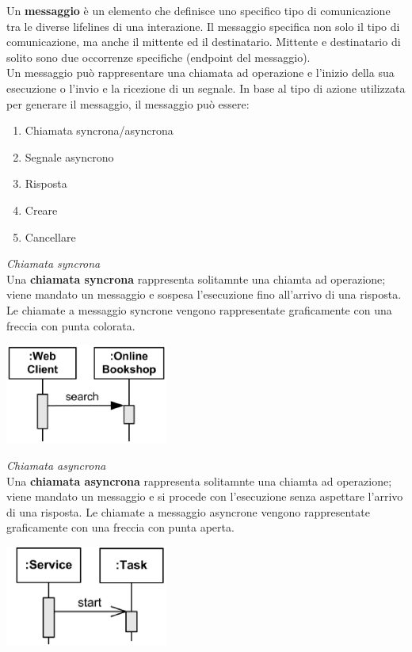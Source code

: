 \documentclass{article}
\begin{document}
Un \textbf{messaggio} è un elemento che definisce uno specifico tipo di comunicazione tra le diverse lifelines di una interazione. Il messaggio specifica non solo il tipo di comunicazione, ma anche il mittente ed il destinatario. Mittente e destinatario di solito sono due occorrenze specifiche (endpoint del messaggio).\\
Un messaggio può rappresentare una chiamata ad operazione e l'inizio della sua esecuzione o l'invio e la ricezione di un segnale. In base al tipo di azione utilizzata per generare il messaggio, il messaggio può essere:
\begin{enumerate}
    \renewcommand{\labelenumi}{-}
    \item Chiamata syncrona/asyncrona
    \item Segnale asyncrono
    \item Risposta
    \item Creare 
    \item Cancellare
\end{enumerate}
\textit{Chiamata syncrona}\\
Una \textbf{chiamata syncrona} rappresenta solitamnte una chiamta ad operazione; viene mandato un messaggio e sospesa l'esecuzione fino all'arrivo di una risposta. Le chiamate a messaggio syncrone vengono rappresentate graficamente con una freccia con punta colorata. 
\begin{center}
    \includegraphics[width=0.4\textwidth]{foto 5.png}\\
\end{center}
\textit{Chiamata asyncrona}\\
Una \textbf{chiamata asyncrona} rappresenta solitamnte una chiamta ad operazione; viene mandato un messaggio e si procede con l'esecuzione senza aspettare l'arrivo di una risposta. Le chiamate a messaggio asyncrone vengono rappresentate graficamente con una freccia con punta aperta. 
\begin{center}
    \includegraphics[width=0.4\textwidth]{foto 6.png}\\
\end{center}
\end{document}
